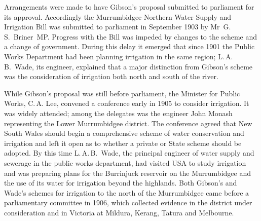 Arrangements were made to have Gibson's proposal submitted to
parliament for its approval.  Accordingly the Murrumbidgee Northern
Water Supply and Irrigation Bill was submitted to parliament in
September 1903 by Mr~G.\,S.~Briner~MP.  Progress
with the Bill was impeded by changes to the scheme and a change of
government. During this delay it emerged that since 1901 the Public
Works Department had been planning irrigation in the same region;
L.\,A.\,B.~Wade,
 its
engineer, explained that a major distinction from Gibson's scheme was
the consideration of irrigation both north and south of the
river.

While Gibson's proposal was still before parliament, the Minister for
Public Works, C.\,A. Lee,  convened a conference
early in 1905 to consider irrigation.  It was widely attended; among
the delegates was the engineer John Monash representing the Lower
Murrumbidgee district.  The conference agreed that New South Wales
should begin a comprehensive scheme of water conservation and
irrigation and left it open as to whether a private or State scheme
should be adopted.  By this time L.\,A.\,B.~Wade, the principal
engineer of water supply and sewerage in the public works department,
had visited USA to study irrigation and was preparing plans for the
Burrinjuck reservoir  on the Murrumbidgee
and the use of its water for irrigation beyond the highlands.  Both
Gibson's and Wade's schemes for irrigation to the north of the
Murrumbidgee came before a parliamentary committee in 1906, which
collected evidence in the district under consideration and in Victoria
at Mildura, Kerang, Tatura and Melbourne.

